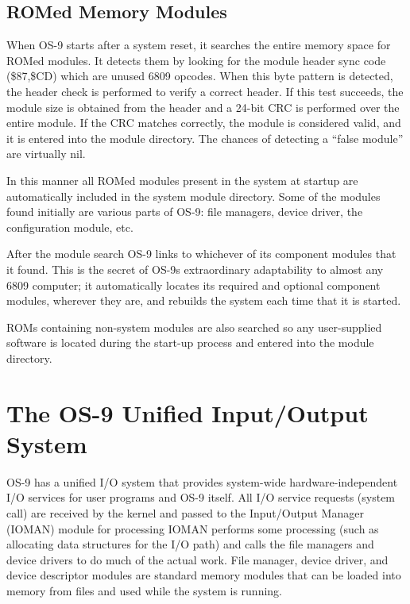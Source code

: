 \documentclass[
]{article}
\begin{document}
\subsection{ROMed Memory Modules}

When OS-9 starts after a system reset, it searches the entire memory
space for ROMed modules. It detects them by looking for the module
header sync code (\$87,\$CD) which are unused 6809 opcodes. When this
byte pattern is detected, the header check is performed to verify a
correct header. If this test succeeds, the module size is obtained from
the header and a 24-bit CRC is performed over the entire module. If the
CRC matches correctly, the module is considered valid, and it is entered
into the module directory. The chances of detecting a ``false module''
are virtually nil.

In this manner all ROMed modules present in the system at startup are
automatically included in the system module directory. Some of the
modules found initially are various parts of OS-9: file managers, device
driver, the configuration module, etc.

After the module search OS-9 links to whichever of its component modules
that it found. This is the secret of OS-9\textquotesingle s
extraordinary adaptability to almost any 6809 computer; it automatically
locates its required and optional component modules, wherever they are,
and rebuilds the system each time that it is started.

ROMs containing non-system modules are also searched so any
user-supplied software is located during the start-up process and
entered into the module directory.

\section{The OS-9 Unified Input/Output System}

OS-9 has a unified I/O system that provides system-wide
hardware-independent I/O services for user programs and OS-9 itself. All
I/O service requests (system call) are received by the kernel and passed
to the Input/Output Manager (IOMAN) module for processing IOMAN performs
some processing (such as allocating data structures for the I/O path)
and calls the file managers and device drivers to do much of the actual
work. File manager, device driver, and device descriptor modules are
standard memory modules that can be loaded into memory from files and
used while the system is running.
\end{document}

